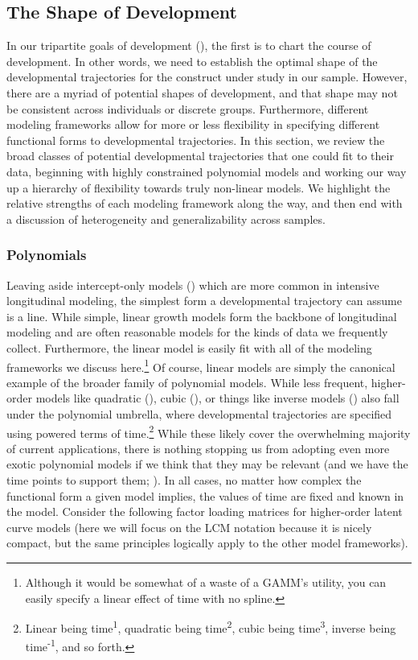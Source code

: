 \documentclass[11pt]{article}
\begin{document}
\subsection{The Shape of Development}
In our tripartite goals of development (\cite{curran_twelve_2010}), the first is to chart the course of development. In other words, we need to establish the optimal shape of the developmental trajectories for the construct under study in our sample. However, there are a myriad of potential shapes of development, and that shape may not be consistent across individuals or discrete groups. Furthermore, different modeling frameworks allow for more or less flexibility in specifying different functional forms to developmental trajectories. In this section, we review the broad classes of potential developmental trajectories that one could fit to their data, beginning with highly constrained polynomial models and working our way up a hierarchy of flexibility towards truly non-linear models. We highlight the relative strengths of each modeling framework along the way, and then end with a discussion of heterogeneity and generalizability across samples. 

\subsubsection{Polynomials}
Leaving aside intercept-only models (\cite{curran_separation_2014}) which are more common in intensive longitudinal modeling, the simplest form a developmental trajectory can assume is a line. While simple, linear growth models form the backbone of longitudinal modeling and are often reasonable models for the kinds of data we frequently collect. Furthermore, the linear model is easily fit with all of the modeling frameworks we discuss here.\footnote{Although it would be somewhat of a waste of a GAMM’s utility, you can easily specify a linear effect of time with no spline.} Of course, linear models are simply the canonical example of the broader family of polynomial models. While less frequent, higher-order models like quadratic (\cite{braams_longitudinal_2015,mccormick_longitudinal_2021,peters_increased_2017,tamnes_diffusion_2018}), cubic (\cite{chassin_developmental_2009,herting_development_2018,mills_structural_2016}), or things like inverse models (\cite{luna_maturation_2004,nelder_inverse_1966}) also fall under the polynomial umbrella, where developmental trajectories are specified using powered terms of time.\footnote{Linear being time\textsuperscript{1}, quadratic being time\textsuperscript{2}, cubic being time\textsuperscript{3}, inverse being time\textsuperscript{-1}, and so forth.} While these likely cover the overwhelming majority of current applications, there is nothing stopping us from adopting even more exotic polynomial models if we think that they may be relevant (and we have the time points to support them; \cite{preacher_meaningful_2015}). In all cases, no matter how complex the functional form a given model implies, the values of time are fixed and known in the model. Consider the following factor loading matrices for higher-order latent curve models (here we will focus on the LCM notation because it is nicely compact, but the same principles logically apply to the other model frameworks).
\end{document}
